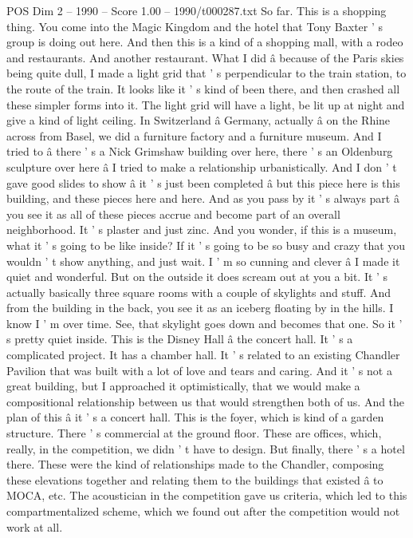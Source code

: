 \begin{textsample}{POS Dim 2 – 1990 – Score 1.00 – 1990/t000287.txt}
So far.
This is a shopping thing.
You come into the Magic Kingdom and the hotel that Tony Baxter ' s group is doing out here.
And then this is a kind of a shopping mall, with a rodeo and restaurants.
And another restaurant.
What I did â because of the Paris skies being quite dull, I made a light grid that ' s perpendicular to the train station, to the route of the train.
It looks like it ' s kind of been there, and then crashed all these simpler forms into it.
The light grid will have a light, be lit up at night and give a kind of light ceiling.
In Switzerland â Germany, actually â on the Rhine across from Basel, we did a furniture factory and a furniture museum.
And I tried to â there ' s a Nick Grimshaw building over here, there ' s an Oldenburg sculpture over here â I tried to make a relationship urbanistically.
And I don ' t gave good slides to show â it ' s just been completed â but this piece here is this building, and these pieces here and here.
And as you pass by it ' s always part â you see it as all of these pieces accrue and become part of an overall neighborhood.
It ' s plaster and just zinc.
And you wonder, if this is a museum, what it ' s going to be like inside?
If it ' s going to be so busy and crazy that you wouldn ' t show anything, and just wait.
I ' m so cunning and clever â I made it quiet and wonderful.
But on the outside it does scream out at you a bit.
It ' s actually basically three square rooms with a couple of skylights and stuff.
And from the building in the back, you see it as an iceberg floating by in the hills.
I know I ' m over time.
See, that skylight goes down and becomes that one.
So it ' s pretty quiet inside.
This is the Disney Hall â the concert hall.
It ' s a complicated project.
It has a chamber hall.
It ' s related to an existing Chandler Pavilion that was built with a lot of love and tears and caring.
And it ' s not a great building, but I approached it optimistically, that we would make a compositional relationship between us that would strengthen both of us.
And the plan of this â it ' s a concert hall.
This is the foyer, which is kind of a garden structure.
There ' s commercial at the ground floor.
These are offices, which, really, in the competition, we didn ' t have to design.
But finally, there ' s a hotel there.
These were the kind of relationships made to the Chandler, composing these elevations together and relating them to the buildings that existed â to MOCA, etc.
The acoustician in the competition gave us criteria, which led to this compartmentalized scheme, which we found out after the competition would not work at all.

\end{textsample}
